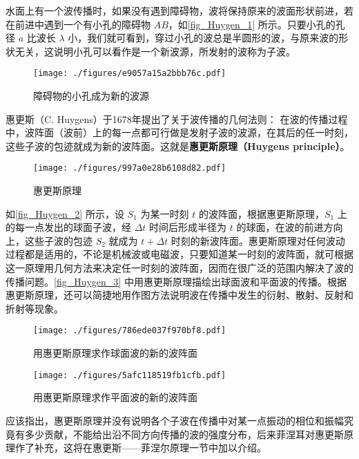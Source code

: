 
水面上有一个波传播时，如果没有遇到障碍物，波将保持原来的波面形状前进，若在前进中遇到一个有小孔的障碍物 $AB$，如\autoref{fig_Huygen_1} 所示。只要小孔的孔径 $a $ 比波长 $\lambda$ 小，我们就可看到，穿过小孔的波总是半圆形的波，与原来波的形状无关，这说明小孔可以看作是一个新波源，所发射的波称为子波。

\begin{figure}[ht]
\centering
\texttt{[image: ./figures/e9057a15a2bbb76c.pdf]}
\caption{障碍物的小孔成为新的波源} \label{fig_Huygen_1}
\end{figure}

惠更斯（C. Huygens）于1678年提出了关于波传播的几何法则： 在波的传播过程中，波阵面（波前）上的每一点都可行做是发射子波的波源，在其后的任一时刻，这些子波的包迹就成为新的波阵面。这就是\textbf{惠更斯原理（Huygens principle）}。
\begin{figure}[ht]
\centering
\texttt{[image: ./figures/997a0e28b6108d82.pdf]}
\caption{惠更斯原理} \label{fig_Huygen_2}
\end{figure}

如\autoref{fig_Huygen_2} 所示，设 $S_1$ 为某一时刻 $t $ 的波阵面，根据惠更斯原理，$S_1$ 上的每一点发出的球面子波，经 $\Delta t$ 时间后形成半径为 $t$ 的球面，在波的前进方向上，这些子波的包迹 $S_2$ 就成为 $t+\Delta t$ 时刻的新波阵面。惠更斯原理对任何波动过程都是适用的，不论是机械波或电磁波，只要知道某一时刻的波阵面，就可根据这一原理用几何方法来决定任一时刻的波阵面，因而在很广泛的范围内解决了波的传播问题。\autoref{fig_Huygen_3} 中用惠更斯原理描绘出球面波和平面波的传播。根据惠更斯原理，还可以简捷地用作图方法说明波在传播中发生的衍射、散射、反射和折射等现象。
\begin{figure}[ht]
\centering
\texttt{[image: ./figures/786ede037f970bf8.pdf]}
\caption{用惠更斯原理求作球面波的新的波阵面} \label{fig_Huygen_3}
\end{figure}
\begin{figure}[ht]
\centering
\texttt{[image: ./figures/5afc118519fb1cfb.pdf]}
\caption{用惠更斯原理求作平面波的新的波阵面} \label{fig_Huygen_4}
\end{figure}
应该指出，惠更斯原理并没有说明各个子波在传播中对某一点振动的相位和振幅究竟有多少贡献，不能给出沿不同方向传播的波的强度分布，后来菲涅耳对惠更斯原理作了补充，这将在惠更斯——菲涅尔原理一节中加以介绍。
